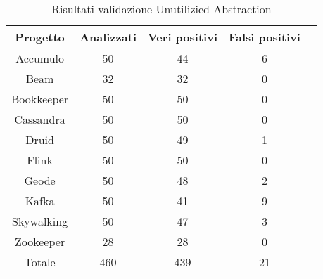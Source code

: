             \begin{table}[h]
            \centering
                \begin{tabular}{|c|c|c|c|c|}
                    \hline
                    \textbf{Progetto} & \textbf{Analizzati} & \textbf{Veri positivi} & \textbf{Falsi positivi} \\
                    \hline
                    Accumulo & 50 & 44 & 6 \\
                    Beam & 32 & 32 & 0 \\
                    Bookkeeper & 50 & 50 & 0  \\
                    Cassandra & 50 & 50 & 0 \\
                    Druid & 50 & 49 & 1 \\
                    Flink & 50 & 50 & 0 \\
                    Geode & 50 & 48 & 2 \\
                    Kafka & 50 & 41 & 9 \\
                    Skywalking & 50 & 47 & 3 \\
                    Zookeeper & 28 & 28 & 0 \\
                    \hline
                    Totale & 460 & 439 & 21 \\
                    \hline
                \end{tabular}
                \caption{Risultati validazione Unutilizied Abstraction}
                \label{tab:caption}
            \end{table}